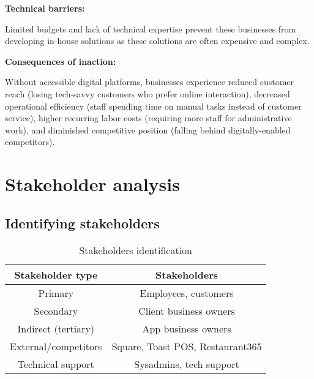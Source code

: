 \documentclass[]{VUMIFTemplateClass}
\begin{document}
\textbf{Technical barriers:}

Limited budgets and lack of technical expertise prevent these businesses from
developing in-house solutions as these solutions are often expensive and complex.

\textbf{Consequences of inaction:}

Without accessible digital platforms, businesses experience reduced customer
reach (losing tech‑savvy customers who prefer online interaction), decreased
operational efficiency (staff spending time on manual tasks instead of customer
service), higher recurring labor costs (requiring more staff for administrative
work), and diminished competitive position (falling behind digitally-enabled
competitors).


\section{Stakeholder analysis}

\subsection{Identifying stakeholders}

\begin{table}[h]
  \centering
  \caption{Stakeholders identification}
  \begin{tabular}{|c|c|}
    \hline
    Stakeholder type    & Stakeholders \\ \hline
    Primary             & Employees, customers \\ \hline
    Secondary           & Client business owners \\ \hline
    Indirect (tertiary) & App business owners \\ \hline
    External/competitors & Square, Toast POS, Restaurant365 \\ \hline
    Technical support   & Sysadmins, tech support \\ \hline
  \end{tabular}
  \label{tab:stakeholders}
\end{table}


\end{document}
